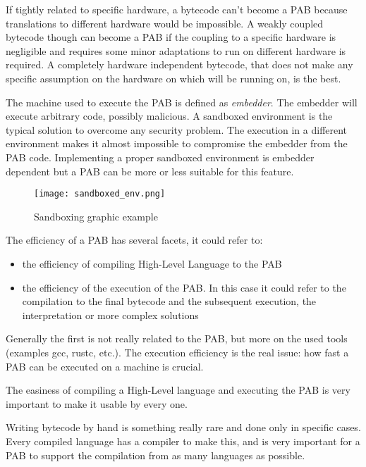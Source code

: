 \begin{description}[style=nextline]
  \item[Hardware Independence]
        If tightly related to specific hardware, a bytecode can't become a PAB because translations to different hardware would be impossible. A weakly coupled bytecode though can become a PAB if the coupling to a specific hardware is negligible and requires some minor adaptations to run on different hardware is required. A  completely hardware independent bytecode, that does not make any specific assumption on the hardware on which will be running on, is the best.
  \item[Sandboxing]
        The machine used to execute the PAB is defined as \textit{embedder}. The embedder will execute arbitrary code, possibly malicious.  A sandboxed environment is the typical solution to overcome any security problem. The execution in a different environment makes it almost impossible to compromise the embedder from the PAB code. Implementing a proper sandboxed environment is embedder dependent but a PAB can be more or less suitable for this feature.

        \begin{figure}[h]
          \centering
          \texttt{[image: sandboxed\_env.png]}
          \caption{Sandboxing graphic example}
          \label{fig:Sandboxing graphic example}
        \end{figure}

  \item[Efficiency]
        The efficiency of a PAB has several facets, it could refer to:

        \begin{itemize}
          \item the efficiency of compiling High-Level Language to the PAB
          \item the efficiency of the execution of the PAB. In this case it could refer to the compilation to the final bytecode and the subsequent execution, the interpretation or more complex solutions
        \end{itemize}

        Generally the first is not really related to the PAB, but more on the used tools (examples gcc, rustc, etc.). The execution efficiency is the real issue: how fast a PAB can be executed on a machine is crucial.
  \item[Tool Simplicity]
        The easiness of compiling a High-Level language and  executing the PAB is very important to make it usable by every one.
  \item[Support as Compilation Target]
        Writing bytecode by hand is something really rare and done only in specific cases. Every compiled language has a compiler to make this, and is very important for a PAB to support the compilation from as many languages as possible.
\end{description}

